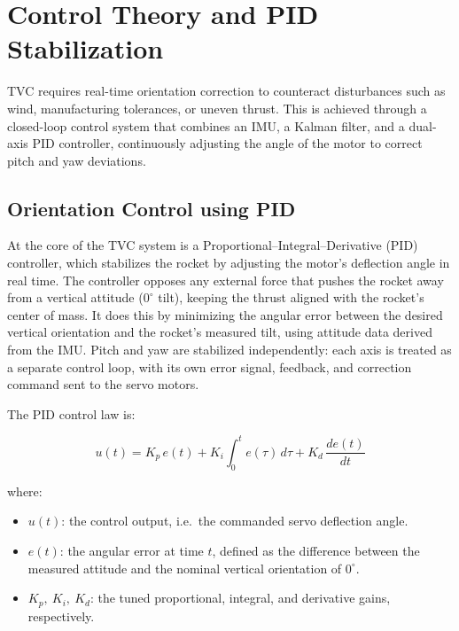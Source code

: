 \section{Control Theory and PID Stabilization}
\label{sec:control}

TVC requires real-time orientation correction to counteract disturbances such as wind, manufacturing tolerances, or uneven thrust. This is achieved through a closed-loop control system that combines an IMU, a Kalman filter, and a dual-axis PID controller, continuously adjusting the angle of the motor to correct pitch and yaw deviations.


\subsection{Orientation Control using PID}
\label{subsec:pid}

At the core of the TVC system is a Proportional--Integral--Derivative (PID) controller, which stabilizes the rocket by adjusting the motor's deflection angle in real time. The controller opposes any external force that pushes the rocket away from a vertical attitude ($0^\circ$ tilt), keeping the thrust aligned with the rocket's center of mass. It does this by minimizing the angular error between the desired vertical orientation and the rocket's measured tilt, using attitude data derived from the IMU. Pitch and yaw are stabilized independently: each axis is treated as a separate control loop, with its own error signal, feedback, and correction command sent to the servo motors.

The PID control law is:

\[
u(t) = K_p\,e(t) + K_i \int_0^t e(\tau)\,d\tau + K_d\,\frac{de(t)}{dt}
\]

where:

\begin{itemize}
    \item $u(t)$: the control output, i.e.\ the commanded servo deflection angle.
    \item $e(t)$: the angular error at time $t$, defined as the difference between the measured attitude and the nominal vertical orientation of $0^\circ$.
    \item $K_p,\ K_i,\ K_d$: the tuned proportional, integral, and derivative gains, respectively.
\end{itemize}

